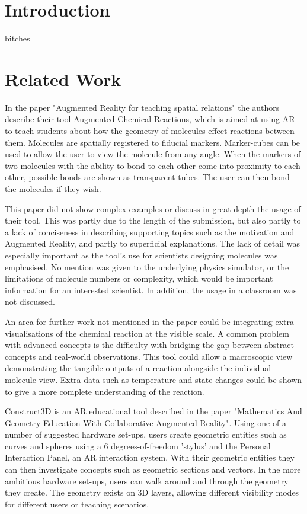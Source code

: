 
\section{Introduction}

 bitches \cite{orc13}

\section{Related Work}

In the paper "Augmented Reality for teaching spatial relations"\cite{Maier09} the authors describe their tool Augmented Chemical Reactions, which is aimed at using AR to teach students about how the geometry of molecules effect reactions between them. Molecules are spatially registered to fiducial markers. Marker-cubes can be used to allow the user to view the molecule from any angle. When the markers of two molecules with the ability to bond to each other come into proximity to each other, possible bonds are shown as transparent tubes. The user can then bond the molecules if they wish.

This paper did not show complex examples or discuss in great depth the usage of their tool. This was partly due to the length of the submission, but also partly to a lack of conciseness in describing supporting topics such as the motivation and Augmented Reality, and partly to superficial explanations. The lack of detail was especially important as the tool's use for scientists designing molecules was emphasised. No mention was given to the underlying physics simulator, or the limitations of molecule numbers or complexity, which would be important information for an interested scientist. In addition, the usage in a classroom was not discussed.

An area for further work not mentioned in the paper could be integrating extra visualisations of the chemical reaction at the visible scale. A common problem with advanced concepts is the difficulty with bridging the gap between abstract concepts and real-world observations. This tool could allow a macroscopic view demonstrating the tangible outputs of a reaction alongside the individual molecule view. Extra data such as temperature and state-changes could be shown to give a more complete understanding of the reaction.

Construct3D is an AR educational tool described in the paper "Mathematics And Geometry Education With Collaborative Augmented Reality"\cite{Kaufmann03}. Using one of a number of suggested hardware set-ups, users create geometric entities such as curves and spheres using a 6 degrees-of-freedom 'stylus' and the Personal Interaction Panel, an AR interaction system\cite{szal97}. With their geometric entities they can then investigate concepts such as geometric sections and vectors. In the more ambitious hardware set-ups, users can walk around and through the geometry they create. The geometry exists on 3D layers, allowing different visibility modes for different users or teaching scenarios. 

